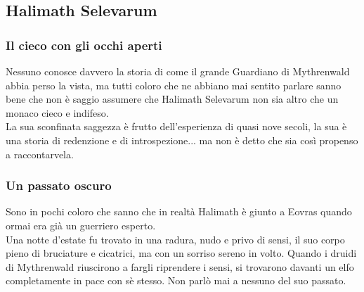 \subsection{Halimath Selevarum}

\subsubsection{Il cieco con gli occhi aperti}

Nessuno conosce davvero la storia di come il grande Guardiano di Mythrenwald abbia perso la vista, ma tutti coloro che ne abbiano mai sentito parlare sanno bene che non è saggio assumere che Halimath Selevarum non sia altro che un monaco cieco e indifeso. \\ La sua sconfinata saggezza è frutto dell'esperienza di quasi nove secoli, la sua è una storia di redenzione e di introspezione... ma non è detto che sia così propenso a raccontarvela.

\subsubsection{Un passato oscuro}

Sono in pochi coloro che sanno che in realtà Halimath è giunto a Eovras quando ormai era già un guerriero esperto. \\ Una notte d'estate fu trovato in una radura, nudo e privo di sensi, il suo corpo pieno di bruciature e cicatrici, ma con un sorriso sereno in volto. Quando i druidi di Mythrenwald riuscirono a fargli riprendere i sensi, si trovarono davanti un elfo completamente in pace con sè stesso. Non parlò mai a nessuno del suo passato.

